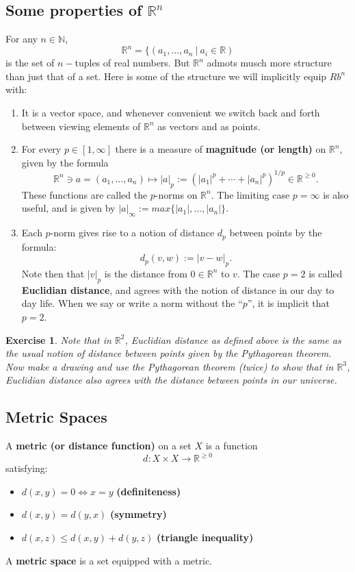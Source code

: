 \documentclass[12pt]{amsart}
\newtheorem{exercise}[theorem]{Exercise}
\numberwithin{equation}{section}
\newcommand\Rb{{\mathbb R}} %
\newcommand\Nb{{\mathbb N}} %
\newcommand{\To}{\longrightarrow}
\newcommand{\mTo}{\longmapsto}
\newcommand{\pipe}{\:|\:}
\begin{document}
\subsection{Some properties of $\Rb^n$} For any $n\in\Nb$, $$\Rb^n = \{(a_1,\dots,a_n\pipe a_i\in\Rb)$$ is the set of $n-$tuples of real numbers.  But $\Rb^n$ admots musch more structure than just that of a set.  Here is some of the structure we will implicitly equip $Rb^n$ with:
\begin{enumerate}
\item It is a vector space, and whenever convenient we switch back and forth between viewing elements of $\Rb^n$ as vectors and as points.
\item For every $p\in [1,\infty]$ there is a measure of \textbf{magnitude (or length)} on $\Rb^n$, given by the formula
$$ \Rb^n\ni a=(a_1,\dots,a_n)\mTo |a|_p:=(|a_1|^p+\cdots+|a_n|^p)^{1/p}\in \Rb^{\geq 0}.$$
These functions are called the $p$-norms on $\Rb^n$.  The limiting case $p=\infty$ is also useful, and is given by $|a|_\infty:=max\{|a_1|,\dots,|a_n|\}$.
\item Each $p$-norm gives rise to a notion of distance $d_p$ between points by the formula:
$$d_p(v,w):=|v-w|_p.$$
Note then that $|v|_p$ is the distance from $0\in\Rb^n$ to $v$.
The case $p=2$ is called \textbf{Euclidian distance}, and agrees with the notion of distance in our day to day life. When we say or write a norm without the ``$p$'', it is implicit that $p=2$.
\end{enumerate}

\begin{exercise} Note that in $\Rb^2$, Euclidian distance as defined above is the same as the usual notion of distance between points given by the Pythagorean theorem.  Now make a drawing and use the Pythagorean theorem (twice) to show that in $\Rb^3$, Euclidian distance also agrees with the distance between points in our universe.
\end{exercise}

\subsection{Metric Spaces} A \textbf{metric (or distance function)} on a set $X$ is a function
$$d:X\times X\To \Rb^{\geq0}$$ satisfying:
 \begin{itemize}
  \item $d(x,y)=0\iff x=y$ \textbf{(definiteness)}
  \item $d(x,y) = d(y,x)$ \textbf{(symmetry)}
  \item $d(x,z)\leq d(x,y)+d(y,z)$ \textbf{(triangle inequality)}
 \end{itemize}
A \textbf{metric space} is a set equipped with a metric.
\end{document}
